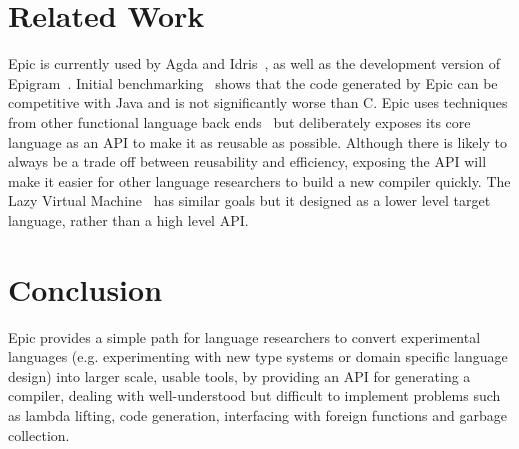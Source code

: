 \section{Related Work}


Epic is currently used by Agda and Idris~\cite{plpv11}, as well as the
development version of Epigram~\cite{levitation}. Initial
benchmarking~\cite{scrap-engine} shows that the code generated by Epic
can be competitive with Java and is not significantly worse than C.
Epic uses techniques from other functional language back
ends~\cite{evalpush,stg,abc-machine} but deliberately exposes its core
language as an API to make it as reusable as possible. Although there
is likely to always be a trade off between reusability and efficiency,
exposing the API will make it easier for other language researchers to
build a new compiler quickly. The Lazy Virtual Machine~\cite{lvm} has
similar goals but it designed as a lower level target language, rather
than a high level API. 


\section{Conclusion}

Epic provides a simple path for language researchers to convert
experimental languages (e.g. experimenting with new type systems or
domain specific language design) into larger scale, usable tools, by
providing an API for generating a compiler, dealing with
well-understood but difficult to implement problems such as lambda
lifting, code generation, interfacing with foreign functions and
garbage collection.

